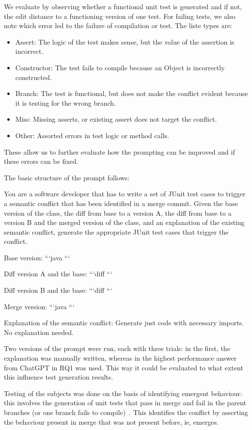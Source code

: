 We evaluate by observing whether a functional unit test is generated and if not, the edit distance to a functioning version of one test. For failing tests, we also note which error led to the failure of compilation or test. The liste types are:
\begin{itemize}
  \item Assert: The logic of the test makes sense, but the value of the assertion is incorrect.
  \item Constructor: The test fails to compile because an Object is incorrectly constructed.
  \item Branch: The test is functional, but does not make the conflict evident because it is testing for the wrong branch.
  \item Miss: Missing asserts, or existing assert does not target the conflict.
  \item Other: Assorted errors in test logic or method calls.
\end{itemize}
These allow us to further evaluate how the prompting can be improved and if these errors can be fixed.

The basic structure of the prompt follows:
\begin{prompt}
You are a software developer that has to write a set of JUnit test cases to trigger a semantic conflict that has been identified in a merge commit.
Given the base version of the class, the diff from base to a version A, the diff from base to a version B and the merged version of the class, and an explanation of the existing semantic conflict, generate the appropriate JUnit test cases that trigger the conflict.

Base version:
```java
```

Diff version A and the base:
```diff
```

Diff version B and the base:
```diff
```

Merge version:
```java
```

Explanation of the semantic conflict:
Generate just code with necessary imports. No explanation needed.
\end{prompt}
Two versions of the prompt were run, each with three trials: in the first, the explanation was manually written, whereas in the highest performance answer from ChatGPT in RQ1 was used.
This way it could be evaluated to what extent this influence test generation results.

Testing of the subjects was done on the basis of identifying emergent behaviour: this involves the generation of unit tests that
pass in merge and fail in the parent branches (or one branch fails to compile)~\citep{kn:nuno}. This identifies the conflict by
asserting the behaviour present in merge that was not present before, ie, emerges.


